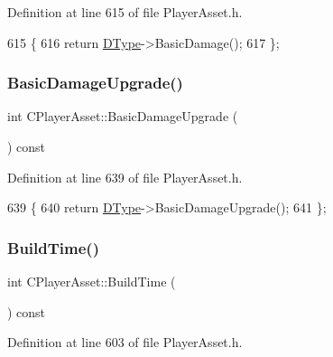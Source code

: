 Definition at line 615 of file Player\+Asset.\+h.


\begin{DoxyCode}
615                                \{
616             \textcolor{keywordflow}{return} \hyperlink{classCPlayerAsset_a5d61f73471e1e6f0a6ab15f2ffa7b359}{DType}->BasicDamage(); 
617         \};
\end{DoxyCode}
\hypertarget{classCPlayerAsset_affad00c05e4a1325601f2dc23df1cf05}{}\label{classCPlayerAsset_affad00c05e4a1325601f2dc23df1cf05} 
\subsubsection{\texorpdfstring{Basic\+Damage\+Upgrade()}{BasicDamageUpgrade()}}
{\footnotesize\ttfamily int C\+Player\+Asset\+::\+Basic\+Damage\+Upgrade (\begin{DoxyParamCaption}{ }\end{DoxyParamCaption}) const\hspace{0.3cm}{\ttfamily [inline]}}



Definition at line 639 of file Player\+Asset.\+h.


\begin{DoxyCode}
639                                       \{
640             \textcolor{keywordflow}{return} \hyperlink{classCPlayerAsset_a5d61f73471e1e6f0a6ab15f2ffa7b359}{DType}->BasicDamageUpgrade();
641         \};
\end{DoxyCode}
\hypertarget{classCPlayerAsset_aba613ebb3be5fd70293468198da9b30d}{}\label{classCPlayerAsset_aba613ebb3be5fd70293468198da9b30d} 
\subsubsection{\texorpdfstring{Build\+Time()}{BuildTime()}}
{\footnotesize\ttfamily int C\+Player\+Asset\+::\+Build\+Time (\begin{DoxyParamCaption}{ }\end{DoxyParamCaption}) const\hspace{0.3cm}{\ttfamily [inline]}}



Definition at line 603 of file Player\+Asset.\+h.


